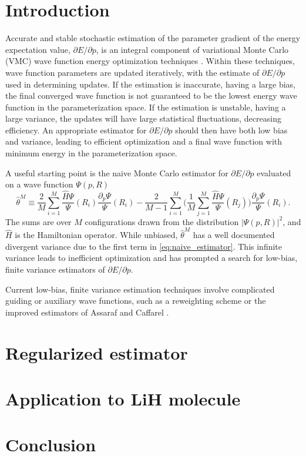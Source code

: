 \documentclass{article}
\begin{document}
\section{Introduction}
Accurate and stable stochastic estimation of the parameter gradient of the energy expectation value, $\partial E/\partial p$, is an integral component of variational Monte Carlo (VMC) wave function energy optimization techniques \cite{PhysRevB.64.024512, doi:10.1063/1.1604379, Toulouse2007}.
Within these techniques, wave function parameters are updated iteratively, with the estimate of $\partial E/\partial p$ used in determining updates.
If the estimation is inaccurate, having a large bias, the final converged wave function is not guaranteed to be the lowest energy wave function in the parameterization space.
If the estimation is unstable, having a large variance, the updates will have large statistical fluctuations, decreasing efficiency.
An appropriate estimator for $\partial E/ \partial p$ should then have both low bias and variance, leading to efficient optimization and a final wave function with minimum energy in the parameterization space.

A useful starting point is the naive Monte Carlo estimator for $\partial E/\partial p$ evaluated on a wave function $\Psi(p, R)$ 
\begin{equation}
\hat{\theta}^M \equiv \frac{2}{M}\sum_{i=1}^M \frac{\hat{H}\Psi}{\Psi}(R_i) \frac{\partial_p \Psi}{\Psi}(R_i) - \frac{2}{M-1} \sum_{i=1}^M \Big(\frac{1}{M} \sum_{j=1}^M \frac{\hat{H}\Psi}{\Psi}(R_j)\Big)\frac{\partial_p \Psi}{\Psi}(R_i). \label{eq:naive_estimator}
\end{equation}
The sums are over $M$ configurations drawn from the distribution $|\Psi(p, R)|^2$, and $\hat{H}$ is the Hamiltonian operator.
While unbiased, $\hat{\theta}^M$ has a well documented divergent variance \cite{Avella} due to the first term in \eqref{eq:naive_estimator}.
This infinite variance leads to inefficient optimization and has prompted a search for low-bias, finite variance estimators of $\partial E/\partial p$.

Current low-bias, finite variance estimation techniques involve complicated guiding or auxiliary wave functions, such as a reweighting scheme \cite{Avella, Attaccalite2008} or the improved estimators of Assaraf and Caffarel \cite{doi:10.1063/1.1286598, Assaraf2003}.

\section{Regularized estimator}
\section{Application to LiH molecule}
\section{Conclusion}


\end{document}
